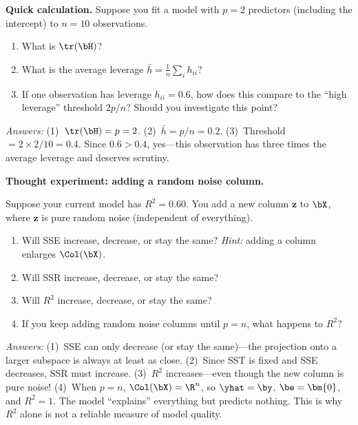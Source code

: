 
\begin{stopandthink}
\textbf{Quick calculation.}
Suppose you fit a model with $p = 2$ predictors (including the intercept)
to $n = 10$ observations.
\begin{enumerate}[nosep]
  \item What is $\tr(\bH)$?
  \item What is the average leverage $\bar{h} = \frac{1}{n}\sum_i h_{ii}$?
  \item If one observation has leverage $h_{ii} = 0.6$, how does this
        compare to the ``high leverage'' threshold $2p/n$?
        Should you investigate this point?
\end{enumerate}
\emph{Answers:} (1)~$\tr(\bH) = p = 2$. \quad
(2)~$\bar{h} = p/n = 0.2$. \quad
(3)~Threshold $= 2 \times 2 / 10 = 0.4$. Since $0.6 > 0.4$, yes---this
observation has three times the average leverage and deserves scrutiny.
\end{stopandthink}



\begin{stopandthink}
\textbf{Thought experiment: adding a random noise column.}

Suppose your current model has $R^2 = 0.60$.
You add a new column $\bm{z}$ to $\bX$, where $\bm{z}$ is pure random noise
(independent of everything).
\begin{enumerate}[nosep]
  \item Will SSE increase, decrease, or stay the same?
        \emph{Hint:} adding a column enlarges $\Col(\bX)$.
  \item Will SSR increase, decrease, or stay the same?
  \item Will $R^2$ increase, decrease, or stay the same?
  \item If you keep adding random noise columns until $p = n$,
        what happens to $R^2$?
\end{enumerate}
\emph{Answers:}
(1)~SSE can only decrease (or stay the same)---the projection onto a
larger subspace is always at least as close.
(2)~Since SST is fixed and SSE decreases, SSR must increase.
(3)~$R^2$ increases---even though the new column is pure noise!
(4)~When $p = n$, $\Col(\bX) = \R^n$, so $\yhat = \by$, $\be = \bm{0}$,
and $R^2 = 1$. The model ``explains'' everything but predicts nothing.
This is why $R^2$ alone is not a reliable measure of model quality.
\end{stopandthink}


